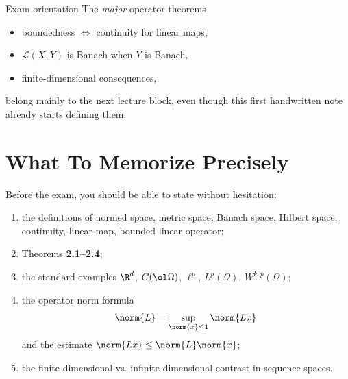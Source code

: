 \documentclass[11pt]{article}
\newcommand{\Lp}{L^p}
\begin{document}
\begin{warningbox}{Exam orientation}
The \emph{major} operator theorems
\begin{itemize}
\item boundedness $\Leftrightarrow$ continuity for linear maps,
\item $\mathcal L(X,Y)$ is Banach when $Y$ is Banach,
\item finite-dimensional consequences,
\end{itemize}
belong mainly to the next lecture block, even though this first handwritten note already starts defining them.
\end{warningbox}

\section{What To Memorize Precisely}

\begin{focusbox}
Before the exam, you should be able to state without hesitation:
\begin{enumerate}
\item the definitions of normed space, metric space, Banach space, Hilbert space, continuity, linear map, bounded linear operator;
\item Theorems \textbf{2.1--2.4};
\item the standard examples $\R^d$, $C(\ol\Omega)$, $\ell^p$, $\Lp(\Omega)$, $W^{k,p}(\Omega)$;
\item the operator norm formula
\[
\norm{L}=\sup_{\norm{x}\le 1}\norm{Lx}
\]
and the estimate $\norm{Lx}\le \norm{L}\norm{x}$;
\item the finite-dimensional vs. infinite-dimensional contrast in sequence spaces.
\end{enumerate}
\end{focusbox}
\end{document}
